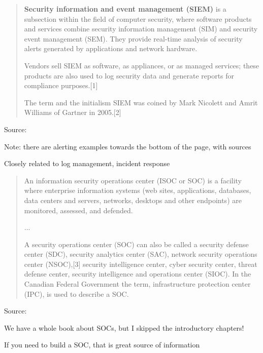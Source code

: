 \documentclass[Screen16to9,17pt]{foils}
\begin{document}


\begin{quote}
{\bf Security information and event management (SIEM)} is a subsection within the field of computer security, where software products and services combine security information management (SIM) and security event management (SEM). They provide real-time analysis of security alerts generated by applications and network hardware.

  Vendors sell SIEM as software, as appliances, or as managed services; these products are also used to log security data and generate reports for compliance purposes.[1]

  The term and the initialism SIEM was coined by Mark Nicolett and Amrit Williams of Gartner in 2005.[2]
\end{quote}
Source: 

\begin{list2}
  \item Note: there are alerting examples towards the bottom of the page, with sources
  \item Closely related to log management, incident response
\end{list2}




\begin{quote}
An information security operations center (ISOC or SOC) is a facility where enterprise information systems (web sites, applications, databases, data centers and servers, networks, desktops and other endpoints) are monitored, assessed, and defended.

...

A security operations center (SOC) can also be called a security defense center (SDC), security analytics center (SAC), network security operations center (NSOC),[3] security intelligence center, cyber security center, threat defense center, security intelligence and operations center (SIOC). In the Canadian Federal Government the term, infrastructure protection center (IPC), is used to describe a SOC.
\end{quote}
Source: 

\begin{list2}
  \item We have a whole book about SOCs, but I skipped the introductory chapters!
  \item If you need to build a SOC, that is great source of information
\end{list2}
\end{document}
